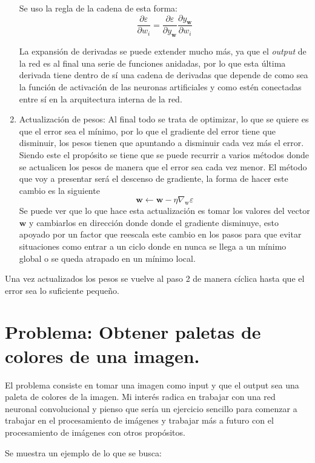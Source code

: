\documentclass[14pt,a4paper]{report}
\begin{document}
\begin{enumerate}
Se uso la regla de la cadena de esta forma:
$$
\frac{\partial\varepsilon}{\partial w_{i}}=\dfrac{\partial \varepsilon}{\partial y_{\textbf{w}}}\dfrac{\partial y_{\textbf{w}}}{\partial w_{i}}
$$ 

La expansión de derivadas se puede extender mucho más, ya que el \textit{output} de la red es al final una serie de funciones anidadas, por lo que esta última derivada tiene dentro de sí una cadena de derivadas que depende de como sea la función de activación de las neuronas artificiales y como estén conectadas entre sí en la arquitectura interna de la red.

\item Actualización de pesos: Al final todo se trata de optimizar, lo que se quiere es que el error sea el mínimo, por lo que el gradiente del error tiene que disminuir, los pesos tienen que  apuntando a disminuir cada vez más el error. Siendo este el propósito se tiene que se puede recurrir a varios métodos donde se actualicen los pesos de manera que el error sea cada vez menor. El método que voy a presentar será el descenso de gradiente, la forma de hacer este cambio es la siguiente $$\textbf{w}\leftarrow\textbf{w}-\eta\nabla_{\text{w}}\varepsilon$$ Se puede ver que lo que hace esta actualización es tomar los valores del vector $\textbf{w}$ y cambiarlos en dirección donde donde el gradiente disminuye, esto apoyado por un factor que reescala este cambio en los pasos para que evitar situaciones como entrar a un ciclo donde en nunca se llega a un mínimo global o se queda atrapado en un mínimo local.

\end{enumerate}

Una vez actualizados los pesos se vuelve al paso 2 de manera cíclica hasta que el error sea lo suficiente pequeño.

\section*{Problema: Obtener paletas de colores de una imagen.}

El problema consiste en tomar una imagen como input y que el output sea una paleta de colores de la imagen. Mi interés radica en trabajar con una red neuronal convolucional y pienso que sería un ejercicio sencillo para comenzar a trabajar en el procesamiento de imágenes y trabajar más a futuro con el procesamiento de imágenes con otros propósitos.

Se muestra un ejemplo de lo que se busca:
\end{document}
